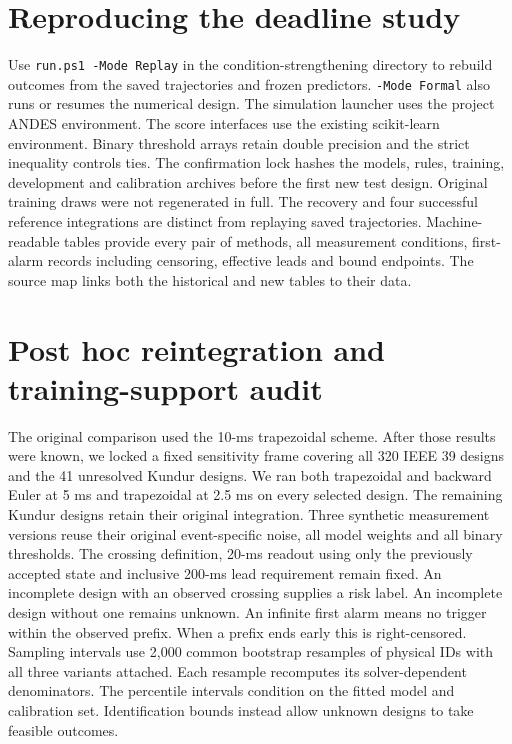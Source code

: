 \documentclass[10pt]{article}
\begin{document}
\section{Reproducing the deadline study}
Use \texttt{run.ps1 -Mode Replay} in the condition-strengthening directory to rebuild outcomes from the saved trajectories and frozen predictors. \texttt{-Mode Formal} also runs or resumes the numerical design. The simulation launcher uses the project ANDES environment. The score interfaces use the existing scikit-learn environment. Binary threshold arrays retain double precision and the strict inequality controls ties. The confirmation lock hashes the models, rules, training, development and calibration archives before the first new test design. Original training draws were not regenerated in full. The recovery and four successful reference integrations are distinct from replaying saved trajectories. Machine-readable tables provide every pair of methods, all measurement conditions, first-alarm records including censoring, effective leads and bound endpoints. The source map links both the historical and new tables to their data.
\clearpage\section{Post hoc reintegration and training-support audit}
The original comparison used the 10-ms trapezoidal scheme. After those results were known, we locked a fixed sensitivity frame covering all 320 IEEE 39 designs and the 41 unresolved Kundur designs. We ran both trapezoidal and backward Euler at 5 ms and trapezoidal at 2.5 ms on every selected design. The remaining Kundur designs retain their original integration. Three synthetic measurement versions reuse their original event-specific noise, all model weights and all binary thresholds. The crossing definition, 20-ms readout using only the previously accepted state and inclusive 200-ms lead requirement remain fixed. An incomplete design with an observed crossing supplies a risk label. An incomplete design without one remains unknown. An infinite first alarm means no trigger within the observed prefix. When a prefix ends early this is right-censored. Sampling intervals use 2,000 common bootstrap resamples of physical IDs with all three variants attached. Each resample recomputes its solver-dependent denominators. The percentile intervals condition on the fitted model and calibration set. Identification bounds instead allow unknown designs to take feasible outcomes.
\end{document}
